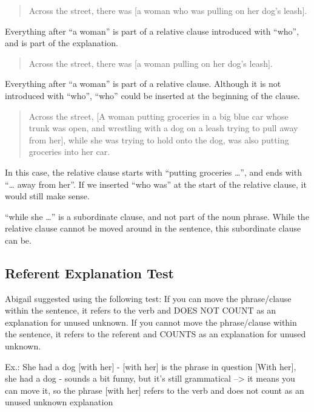 \documentclass[
]{book}
\begin{document}
\begin{quote}
Across the street,
there was {[}a woman who was pulling on her dog's leash{]}.
\end{quote}

Everything after ``a woman''
is part of a relative clause introduced with ``who'',
and is part of the explanation.

\begin{quote}
Across the street,
there was {[}a woman pulling on her dog's leash{]}.
\end{quote}

Everything after ``a woman'' is part of a relative clause.
Although it is not introduced with ``who'',
``who'' could be inserted at the beginning of the clause.

\begin{quote}
Across the street,
{[}A woman putting groceries in a big blue car whose trunk was open,
and wrestling with a dog on a leash trying to pull away from her{]},
while she was trying to hold onto the dog,
was also putting groceries into her car.
\end{quote}

In this case, the relative clause starts with ``putting groceries \ldots{}'',
and ends with ``\ldots{} away from her''.
If we inserted ``who was'' at the start of the relative clause,
it would still make sense.

``while she \ldots{}'' is a subordinate clause, and not part of the noun phrase.
While the relative clause cannot be moved around in the sentence,
this subordinate clause can be.

\hypertarget{referent-explanation-test}{%
\subsection{Referent Explanation Test}\label{referent-explanation-test}}

Abigail suggested using the following test:
If you can move the phrase/clause within the sentence, it refers to the verb and DOES NOT COUNT as an explanation for unused unknown.
If you cannot move the phrase/clause within the sentence, it refers to the referent and COUNTS as an explanation for unused unknown.

Ex.:
She had a dog {[}with her{]} - {[}with her{]} is the phrase in question
{[}With her{]}, she had a dog - sounds a bit funny, but it's still grammatical --\textgreater{} it means you can move it, so the phrase {[}with her{]} refers to the verb and does not count as an unused unknown explanation
\end{document}
